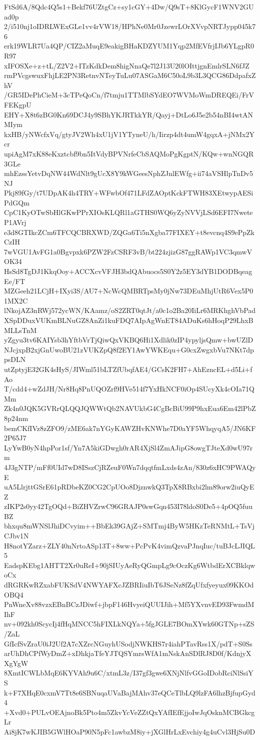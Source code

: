 FtSd6A/8Qdc4Q5s1+Bekf76UZtgCz+sy1cGY+4Dw/Q9sT+8KlGycF1WNV2GUad0p
2/i510nj1oIDRLWExGLe1vv4rVW18/HPhNe0Mr0JzewrLOrXVvpNRTJypp045k76
erk19WLR7Ua4QP/CIZ2aMuqE9eakigBHaKDZYUM1Yqp2MfEVfrjIJb6YLgpR0R97
xIFOSXe+z+tL/Z2V2+ITzKdkDem8higNnaQe7l2J13U20lOIttjgnEmlrSLN6fJZ
rmPVcgswuxFhjLE2PN3RetnvNTeyTuLu07ASGaM6C50oL9b3L3QCG86DdpafxZhV
/GR5IDePhCieM+3cTPeQoCn/f7tmju1TTMlbSYdEO7WVMoWmDREQEi/FrVFEKgpU
EHY+X8t6zBG0Kn69DCJ4y9SBhYKJRTkkYR/Qayj+DtLo6J5e2b54nBI4wtANMIym
kxHB/yNWcfxVq/gtyJV2Wh4xU1jV1YTyneU/h/Iirzp4dt4umW4gqxA+jNMx2Ycr
upiAgM7xK88eKxztcbf9bn5ItVdyBPVNrfeCbSAQMoPgKgptN/KQw+wnNGQR3GLe
mhEzssYetvDqNW44WdNlt9gUcX8Y9kWGeesNphZJnlEWfg+ii74aVSHlpTnDv5NJ
Pkj89fGy/t7UDpAK4h4TRY+WFwbOf471LFdZAOptKckFTWH83XEtwypAESiPdGQm
CpC1KyOTwSbHlGKwPPrXIOsKLQRl1aGTHS0WQ6yZyNVVjLSd6EFI7NweteP1AVrj
e3d8GTIkcZCm6TFCQCBRXWD/ZQGa6Ti5nXgba77FIXEY+t8evcnq4S9ePpZkCzIH
7wVGU1AvFG1a0Bgvpxk6PZW2FzCSRF3vB/bt224zjizG87ggRAWp1VC3qmwVOK34
HsSd8TgDJ1KkqOoy+ACCXcvVFJH3bdQAbuocs5S0Y2z5EY3dYB1DODBqeagEe/FT
MZGeeh21LCjH+IXyi3S/AU7+NcWcQMBRTpsMy0jNw73DEuMhjUtR6Vex5P01MX2C
lNkojAZ3nRWj572ycWN/KAamz/oS2ZRT0qtJt/a0c1o2Ba20IiLr6MRKhghVbPad
XSpDDuxVUKmBLNuGZ8AnZi1kuFDQ7AIpAgWnET84ADuKs6hHoqP29LhxBMLLsTnM
yZgyu3tv6KAIYsb3hYftbVrTjQiwQxVKBQ6Hi1Xdlik0zIP4ypyljsQmw+bwUZlD
NJcjxpB2xjGnUwoBU21zVUKZpQ8f2EY1AwYWKEqu+G0cxZwgxbVu7NKt7dppsDLN
utZptyjE32GK4sHyS/JIWml51bLTZfUbqfAE4/GCsK2FH7+AhEzncEL+d5Li+fAo
T/cdd4+wZdJH/Nr8Hq8PnUQOZrf9HVe514f7YxHkNCF0iOp4SUcyXk4cOIa71QMm
Zk4n0JQK5GVRrQLQQJQWWtQb2NAVUkbG4CgBcBiU99P9hxEua6Em42lPbZ8p24nm
bemCKfIVz8zZFO9/zME6ak7nYGyKAWZHvKNWhe7D0aYF5WhqyqA5/JN6KF2P65J7
LyYwB0yN4hpPor1sf/Yn7A5kiGDwgh0rAR4XjSl4ZmAJipG8owgTJteXd0wU97rm
4J3gNTP/mFf0UId7wD8ISszCjRZeuF0Wn7dqqtfmLxds4zAn/830z6xHC9PWAQyE
uA5LlrjttGSrE61pRDbeKZ0CG2CpUOo8DjznwkQ3TpX8RBxbi2lm89orw2iuQyEZ
zIKP2s0yy42TgOQd+BiZHVZrwC96GRAJP0swGqn453I78ldoS0De5+4pOQ5fuuBZ
bhxqu8mWNSlJhiDCvyim++BbEk39GAjZ+SMTmj4ByW5HKzTeRNMtL+TsVjCJbv1N
H8notYZarz+ZLY40nNrtoASp13T+8ww+PcPvK4vimQzvaPJnqIuc/tuBJcLJIQL5
EadspKEbg1AHTT2Xr0uReI+90jSIUyAeRyQGmpLg9cOczKg6WtbdErXCBklqwoCx
dRGRKwRZxabFUKSdV4NWYAFXcJZBRIiuIbT6JSeNz8fZqUfxfyeyux09KKOdOBQ4
PnWneXv88vzxEBnBCzJDiwf+jbpF146HvyeiQUUIJih+Mf5YXvnvED93FwmdMIhF
nv+092kh0ScycIj4fHqMNCC5hFIXLkNQYa+5fgJGLE7BOmXYwk60GTNp+sZS/ZaL
GfIcfSvZraU0iJ2Uf2A7cXZrcNGuyhUSodjNWKHS7r4iahPTavRss1X/pdT+S0Ss
arUhDhCPfWyDmZ+xDhkjaTfeYJTQSYmrsWfA1mNskAnSDlRJ8D0f/KdnjyXXgYgW
8XmtICWLbMqE6KYVAh9u6C/xtmL3z/I37gf3gwe6XNjNlfvGGoIDobRciNlSsiYS
k+F7XHqE0cxmV7Tt8e6SBNuqaUVaBajMAhv37eQCeTlbLQ9lzFA6lhzBjfupGyd4
+Xvd0+PULvOEAjnoBk5Pto4m5ZkvYcVeZZtQxYAfIEfEjjoIwJqOsknMCBGkcgLr
Ai8jK7wKJIB5GWlHOaP90N5pFc1awbzM8iy+jXGlHrLxEvchiy4g4uCvl3HjSu0D
